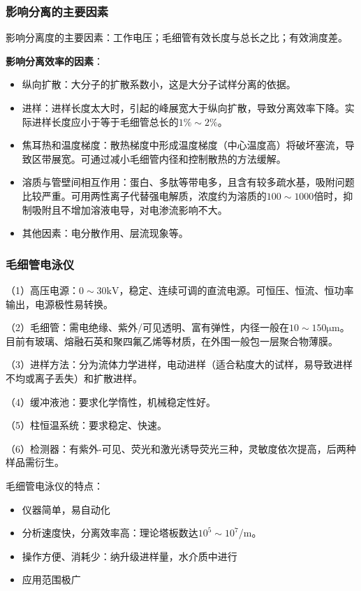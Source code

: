 \subsubsection{影响分离的主要因素}
\noindent 影响分离度的主要因素：工作电压；毛细管有效长度与总长之比；有效淌度差。

\noindent \textbf{影响分离效率的因素}：
\begin{itemize}
	\item 纵向扩散：大分子的扩散系数小，这是大分子试样分离的依据。
	\item 进样：进样长度太大时，引起的峰展宽大于纵向扩散，导致分离效率下降。实际进样长度应小于等于毛细管总长的$1\%\sim 2\%$。
	\item 焦耳热和温度梯度：散热梯度中形成温度梯度（中心温度高）将破坏塞流，导致区带展宽。可通过减小毛细管内径和控制散热的方法缓解。
	\item 溶质与管壁间相互作用：蛋白、多肽等带电多，且含有较多疏水基，吸附问题比较严重。可用两性离子代替强电解质，浓度约为溶质的$100\sim 1000$倍时，抑制吸附且不增加溶液电导，对电渗流影响不大。
	\item 其他因素：电分散作用、层流现象等。
\end{itemize}

\subsubsection{毛细管电泳仪}
（1）高压电源：$0\sim 30\mathrm{kV}$，稳定、连续可调的直流电源。可恒压、恒流、恒功率输出，电源极性易转换。

（2）毛细管：需电绝缘、紫外/可见透明、富有弹性，内径一般在$10\sim 150\mathrm{\mu m}$。目前有玻璃、熔融石英和聚四氟乙烯等材质，在外围一般包一层聚合物薄膜。

（3）进样方法：分为流体力学进样，电动进样（适合粘度大的试样，易导致进样不均或离子丢失）和扩散进样。

（4）缓冲液池：要求化学惰性，机械稳定性好。

（5）柱恒温系统：要求稳定、快速。

（6）检测器：有紫外-可见、荧光和激光诱导荧光三种，灵敏度依次提高，后两种样品需衍生。

\noindent 毛细管电泳仪的特点：
\begin{itemize}
	\item 仪器简单，易自动化
	\item 分析速度快，分离效率高：理论塔板数达$10^5\sim 10^7$/m。
	\item 操作方便、消耗少：纳升级进样量，水介质中进行
	\item 应用范围极广
\end{itemize}


